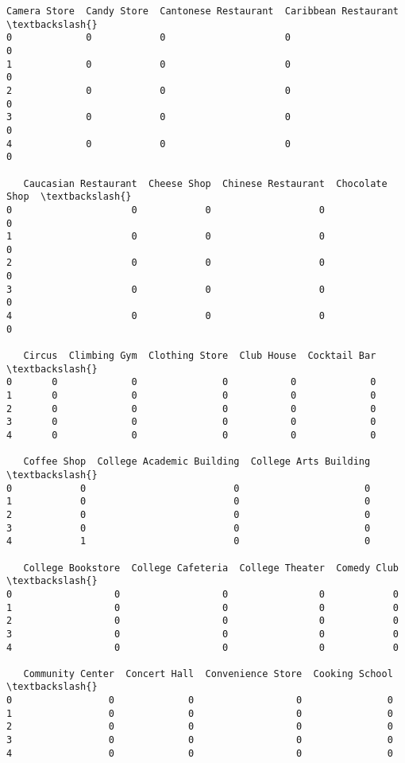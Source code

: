 \documentclass[11pt]{article}
\begin{document}
\begin{tcolorbox}[breakable, size=fbox, boxrule=.5pt, pad at break*=1mm, opacityfill=0]
\begin{Verbatim}[commandchars=\\\{\}]
   Camera Store  Candy Store  Cantonese Restaurant  Caribbean Restaurant  \textbackslash{}
0             0            0                     0                     0
1             0            0                     0                     0
2             0            0                     0                     0
3             0            0                     0                     0
4             0            0                     0                     0

   Caucasian Restaurant  Cheese Shop  Chinese Restaurant  Chocolate Shop  \textbackslash{}
0                     0            0                   0               0
1                     0            0                   0               0
2                     0            0                   0               0
3                     0            0                   0               0
4                     0            0                   0               0

   Circus  Climbing Gym  Clothing Store  Club House  Cocktail Bar  \textbackslash{}
0       0             0               0           0             0
1       0             0               0           0             0
2       0             0               0           0             0
3       0             0               0           0             0
4       0             0               0           0             0

   Coffee Shop  College Academic Building  College Arts Building  \textbackslash{}
0            0                          0                      0
1            0                          0                      0
2            0                          0                      0
3            0                          0                      0
4            1                          0                      0

   College Bookstore  College Cafeteria  College Theater  Comedy Club  \textbackslash{}
0                  0                  0                0            0
1                  0                  0                0            0
2                  0                  0                0            0
3                  0                  0                0            0
4                  0                  0                0            0

   Community Center  Concert Hall  Convenience Store  Cooking School  \textbackslash{}
0                 0             0                  0               0
1                 0             0                  0               0
2                 0             0                  0               0
3                 0             0                  0               0
4                 0             0                  0               0


\end{Verbatim}
\end{tcolorbox}
\end{document}
